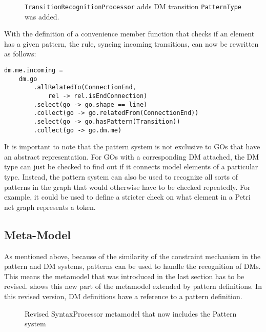 \begin{figure}[H]
  \centering
  
  \caption{\texttt{TransitionRecognitionProcessor} adds DM transition \texttt{PatternType} was added.}
  \label{fig:Transition-Kind-Recognition}
\end{figure}


With the definition of a convenience member function that checks if an element has a given pattern, the rule, syncing incoming transitions, can now be rewritten as follows:


\begin{lstlisting}[captionpos=b,caption={Improved incoming transition rule, which also filters for elements that match the \texttt{Transition} pattern.}]
dm.me.incoming = 
    dm.go
        .allRelatedTo(ConnectionEnd,
            rel -> rel.isEndConnection)
        .select(go -> go.shape == line)
        .collect(go -> go.relatedFrom(ConnectionEnd))
        .select(go -> go.hasPattern(Transition))
        .collect(go -> go.dm.me)
\end{lstlisting}



It is important to note that the pattern system is not exclusive to GOs that have an abstract representation. For GOs with a corresponding DM attached, the DM type can just be checked to find out if it connects model elements of a particular type. Instead, the pattern system can also be used to recognize all sorts of patterns in the graph that would otherwise have to be checked repeatedly. For example, it could be used to define a stricter check on what element in a Petri net graph represents a token.

\subsection{Meta-Model}
As mentioned above, because of the similarity of the constraint mechanism in the pattern and DM systems, patterns can be used to handle the recognition of DMs. This means the metamodel that was introduced in the last section has to be revised.  shows this new part of the metamodel extended by pattern definitions. In this revised version, DM definitions have a reference to a pattern definition.

\begin{figure}[H]
  \centering
  
  \caption{Revised SyntaxProcessor metamodel that now includes the Pattern system}
  \label{fig:revised-syntax-model}
\end{figure}

